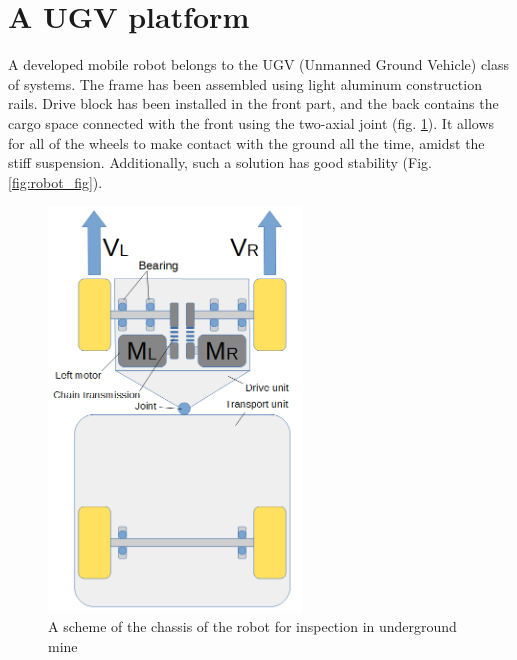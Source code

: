 \documentclass[3p,times,12pt]{elsarticle}
\begin{document}
\section{A UGV platform}\label{meth} 

A developed mobile robot belongs to the UGV (Unmanned Ground Vehicle) class of systems. The frame has been assembled using light aluminum construction rails. Drive block has been installed in the front part, and the back contains the cargo space connected with the front using the two-axial joint (fig. \ref{robot_scheme}). It allows for all of the wheels to make contact with the ground all the time, amidst the stiff suspension. Additionally, such a solution has good stability (Fig. \ref{fig:robot_fig}).



\begin{figure}[ht!]
\centering
\begin{minipage}[c]{0.48\textwidth}
\centering
\includegraphics[width=0.6\textwidth]{Robot_scheme.png}
\caption{A scheme of the chassis of the robot for inspection in underground mine}
\label{robot_scheme}
\end{minipage}
\hfill
\begin{minipage}[c]{0.48\textwidth}
\centering

\end{minipage}
\end{figure}
\end{document}
